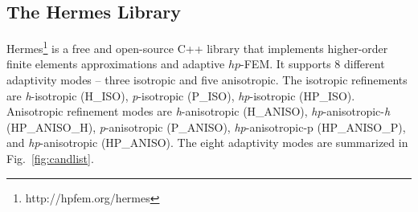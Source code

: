 \subsection{The Hermes Library}

Hermes\footnote{http://hpfem.org/hermes} is a free and open-source C++ library 
that implements higher-order finite elements approximations and adaptive $hp$-FEM.
It supports 8 different adaptivity modes -- three isotropic and five anisotropic. 
The isotropic refinements are
\emph{h}-isotropic (H\_ISO), \emph{p}-isotropic (P\_ISO), \emph{hp}-isotropic (HP\_ISO).
Anisotropic refinement modes are
\emph{h}-anisotropic (H\_ANISO),
\emph{hp}-anisotropic-\emph{h} (HP\_ANISO\_H), \emph{p}-anisotropic (P\_ANISO),
\emph{hp}-anisotropic-p (HP\_ANISO\_P), and \emph{hp}-anisotropic (HP\_ANISO).
The eight adaptivity modes are summarized in Fig.~\ref{fig:candlist}.

